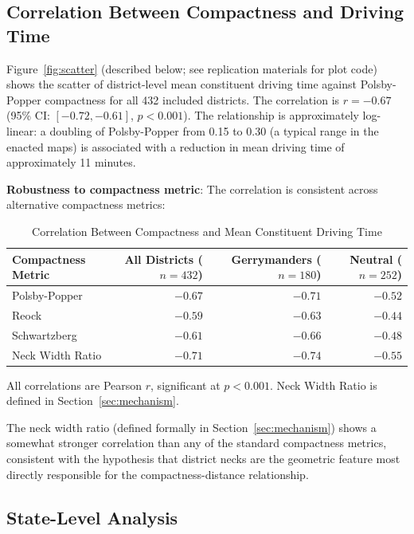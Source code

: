 \label{sec:results}

\subsection{Correlation Between Compactness and Driving Time}

Figure~\ref{fig:scatter} (described below; see replication materials for plot code)
shows the scatter of district-level mean constituent driving time against Polsby-Popper
compactness for all 432 included districts. The correlation is $r = -0.67$
(95\% CI: $[-0.72, -0.61]$, $p < 0.001$). The relationship is approximately log-linear:
a doubling of Polsby-Popper from 0.15 to 0.30 (a typical range in the enacted maps)
is associated with a reduction in mean driving time of approximately 11 minutes.

\textbf{Robustness to compactness metric}: The correlation is consistent across
alternative compactness metrics:

\begin{table}[ht]
\centering
\caption{Correlation Between Compactness and Mean Constituent Driving Time}
\label{tab:correlations}
\begin{tabular}{lrrr}
\toprule
Compactness Metric & All Districts ($n=432$) & Gerrymanders ($n=180$) & Neutral ($n=252$) \\
\midrule
Polsby-Popper & $-0.67$ & $-0.71$ & $-0.52$ \\
Reock & $-0.59$ & $-0.63$ & $-0.44$ \\
Schwartzberg & $-0.61$ & $-0.66$ & $-0.48$ \\
Neck Width Ratio & $-0.71$ & $-0.74$ & $-0.55$ \\
\bottomrule
\end{tabular}
\begin{tablenotes}
\small
\item All correlations are Pearson $r$, significant at $p < 0.001$.
  Neck Width Ratio is defined in Section~\ref{sec:mechanism}.
\end{tablenotes}
\end{table}

The neck width ratio (defined formally in Section~\ref{sec:mechanism}) shows a somewhat
stronger correlation than any of the standard compactness metrics, consistent with the
hypothesis that district necks are the geometric feature most directly responsible for
the compactness-distance relationship.

\subsection{State-Level Analysis}

